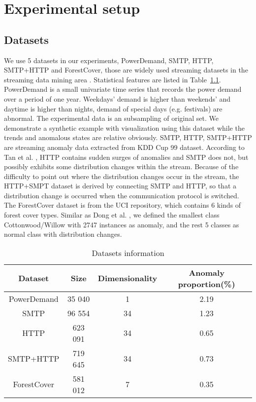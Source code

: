 \chapter{Experimental setup}
\label{chap:Experimentalsetup}


\section{Datasets}
\label{sec:datasets}

We use 5 datasets in our experiments, PowerDemand, SMTP, HTTP, SMTP+HTTP and ForestCover, those are widely used streaming datasets in the streaming data mining area \cite{encdecad}\cite{threaded}\cite{tan}. Statistical features are listed in  Table~\ref{tab:dataset}. PowerDemand is a small univariate time series that records the power demand over a period of one year. Weekdays’ demand is higher than weekends’ and daytime is higher than nights, demand of special days (e.g. festivals) are abnormal. The experimental data is an subsampling of original set. We demonstrate a synthetic example with visualization using this dataset while the trends and anomalous states are relative obviously. SMTP, HTTP, SMTP+HTTP are streaming anomaly data extracted from KDD Cup 99 dataset. According to Tan et al. \cite{tan}, HTTP contains sudden surges of anomalies and SMTP does not, but possibly exhibits some distribution changes within the stream. Because of the difficulty to point out where the distribution changes occur in the stream, the HTTP+SMPT dataset is derived by connecting SMTP and HTTP, so that a distribution change is occurred when the communication protocol is switched. The ForestCover dataset is from the UCI repository, which contains 6 kinds of forest cover types. Similar as Dong et al. \cite{threaded}, we defined the smallest class Cottonwood/Willow with 2747 instances as anomaly, and the rest 5 classes as normal class with distribution changes.

\begin{table}[ht] 
\caption{Datasets information} 
\centering      
\begin{tabular}{c c c c}  
\hline\hline        
Dataset & Size & Dimensionality & Anomaly proportion(\%) \\ [0.5ex] 
\hline 
PowerDemand & 35 040 & 1 &  2.19\\  
SMTP & 96 554 & 34 & 1.23  \\ 
HTTP & 623 091 & 34  & 0.65  \\ 
SMTP+HTTP & 719 645 & 34 & 0.73 \\ 
ForestCover & 581 012 & 7 & 0.35 \\ [1ex]  
\hline    
\end{tabular}
\label{tab:dataset}  
\end{table} 

